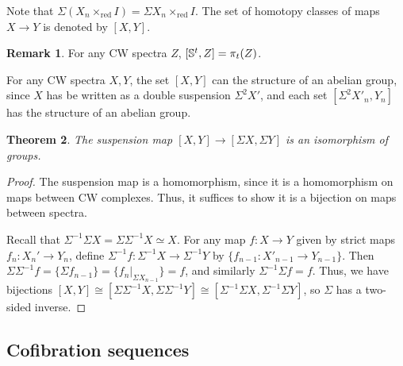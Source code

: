 \documentclass[11pt, titlepage]{article} %
\def\bb{\ensuremath\mathbb}
\numberwithin{equation}{subsection}
\theoremstyle{plain}
\newtheorem{theorem}{Theorem}[subsection]
\theoremstyle{definition}
\newtheorem{remark}[theorem]{Remark}
\begin{document}
Note that \(\Sigma(X_n\times_{\text{red}}I)=\Sigma X_n\times_{\text{red}}I\). The set of homotopy classes of maps \(X\to Y\) is denoted by \([X,Y]\). 

\begin{remark}
For any CW spectra \(Z\), \([\bb{S}^t, Z]=\pi_t(Z)\). %
\end{remark}

For any CW spectra \(X,Y\), the set \([X,Y]\) can the structure of an abelian group, since \(X\) has be written as a double suspension \(\Sigma^2X'\), and each set \([\Sigma^2X'_n, Y_n]\) has the structure of an abelian group. %

\begin{theorem}\label{2504151310}
The suspension map \([X,Y]\to [\Sigma X, \Sigma Y]\) is an isomorphism of groups.
\end{theorem}

\begin{proof}
The suspension map is a homomorphism, since it is a homomorphism on maps between CW complexes. Thus, it suffices to show it is a bijection on maps between spectra. 

Recall that \(\Sigma^{-1}\Sigma X=\Sigma\Sigma^{-1}X\simeq X\). For any map \(f : X \to Y\) given by strict maps \(f_n : X_n'\to Y_n\), define \(\Sigma^{-1}f : \Sigma^{-1}X \to \Sigma^{-1}Y\) by \(\{f_{n-1} : X'_{n-1}\to Y_{n-1}\}\). Then \(\Sigma\Sigma^{-1}f=\{\Sigma f_{n-1}\}=\{f_n|_{\Sigma X_{n-1}}\}=f\), and similarly \(\Sigma^{-1}\Sigma f =f\). Thus, we have bijections \([X,Y]\cong [\Sigma\Sigma^{-1}X, \Sigma\Sigma^{-1}Y]\cong [\Sigma^{-1}\Sigma X, \Sigma^{-1}\Sigma Y]\), so \(\Sigma\) has a two-sided inverse.
\end{proof}




\subsection{Cofibration sequences}\label{2503291211}
\end{document}
